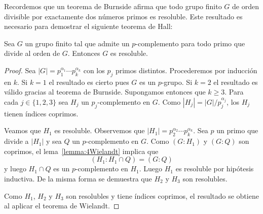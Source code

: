 Recordemos que un teorema de Burnside afirma que todo grupo finito $G$ de orden
divisible por exactamente dos números primos es resoluble. Este resultado es
necesario para demostrar el siguiente teorema de Hall:

\begin{theorem}[Hall]
	\label{theorem:Hall:solvable}
	Sea $G$ un grupo finito tal que admite un $p$-complemento para todo primo
	que divide al orden de $G$. Entonces $G$ es resoluble.
\end{theorem}

\begin{proof}
	Sea $|G|=p_1^{\alpha_1}\cdots
	p_k^{\alpha_k}$ con los $p_j$ primos distintos. Procederemos por inducción
	en $k$. Si $k=1$ el resultado es cierto pues $G$ es un $p$-grupo. Si $k=2$
	el resultado es válido gracias al teorema de Burnside. Supongamos entonces
	que $k\geq3$. Para cada $j\in\{1,2,3\}$ sea $H_j$ un $p_j$-complemento en
	$G$. Como $|H_j|=|G|/p_j^{\alpha_j}$, los $H_j$ tienen índices coprimos.

	Veamos que $H_1$ es resoluble. Observemos que $|H_1|=p_2^{\alpha_2}\cdots
	p_k^{\alpha_k}$. Sea $p$ un primo que divide a $|H_1|$ y sea $Q$ un
	$p$-complemento en $G$. 
	Como $(G:H_1)$ y $(G:Q)$ son
	coprimos, el lema~\ref{lemma:4Wielandt} implica que 
	\[
	(H_1:H_1\cap Q)=(G:Q)
	\]
	y luego $H_1\cap Q$ es un $p$-complemento en $H_1$.  Luego $H_1$ es
	resoluble por hipótesis inductiva. De la misma forma se demuestra que $H_2$
	y $H_3$ son resolubles.

	Como $H_1$, $H_2$ y $H_3$ son resolubles y tiene índices coprimos, el
	resultado se obtiene al aplicar el teorema de
	Wielandt.
\end{proof}
